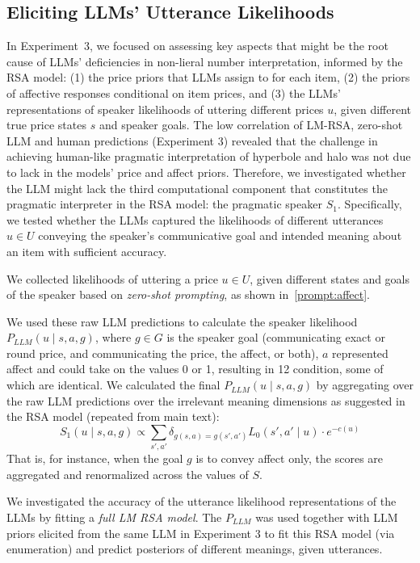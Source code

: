 \subsection{Eliciting LLMs' Utterance Likelihoods}
In Experiment~3, we focused on assessing key aspects that might be the root cause of LLMs' deficiencies in non-lieral number interpretation, informed by the RSA model: 
(1) the price priors that LLMs assign to for each item, (2) the priors of affective responses conditional on item prices, and (3) the LLMs' representations of speaker likelihoods of uttering different prices $u$, given different true price states $s$ and speaker goals. 
The low correlation of LM-RSA, zero-shot LLM and human predictions (Experiment 3) revealed that the challenge in achieving human-like pragmatic interpretation of hyperbole and halo was not due to lack in the models’ price and affect priors.
Therefore, we investigated whether the LLM might lack the third computational component that constitutes the pragmatic interpreter in the RSA model: the pragmatic speaker $S_1$.  
Specifically, we tested whether the LLMs captured the likelihoods of different utterances $u \in U$ conveying the speaker's communicative goal and intended meaning about an item with sufficient accuracy. 

We collected likelihoods of uttering a price $u \in U$, given different states and goals of the speaker based on \textit{zero-shot prompting}, as shown in~\autoref{prompt:affect}.

We used these raw LLM predictions to calculate the speaker likelihood $P_{LLM}(u \mid s, a, g)$, where $g \in G$ is the speaker goal (communicating exact or round price, and communicating the price, the affect, or both), $a$ represented affect and could take on the values 0 or 1, resulting in 12 condition, some of which are identical.
We calculated the final $P_{LLM}(u \mid s, a, g)$ by aggregating over the raw LLM predictions over the irrelevant meaning dimensions as suggested in the RSA model (repeated from main text): 
$$S_1 (u \mid s, a, g) \propto \sum_{s', a'} \delta_{g(s, a) = g(s', a')}L_0(s', a' \mid u) \cdot e^{-c(u)}$$
That is, for instance, when the goal $g$ is to convey affect only, the scores are aggregated and renormalized across the values of $S$.  

We investigated the accuracy of the utterance likelihood representations of the LLMs by fitting a \textit{full LM RSA model}.
The $P_{LLM}$ was used together with LLM priors elicited from the same LLM in Experiment 3 to fit this RSA model (via enumeration) and predict posteriors of different meanings, given utterances. 
 
